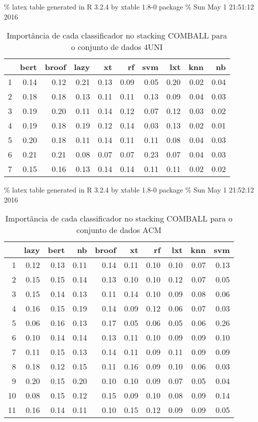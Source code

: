 \documentclass[]{article}
\begin{document}
\% latex table generated in R 3.2.4 by xtable 1.8-0 package \% Sun May 1
21:51:12 2016

\begin{table}[ht]
\centering
\begin{tabular}{rrrrrrrrrr}
  \hline
 & bert & broof & lazy & xt & rf & svm & lxt & knn & nb \\ 
  \hline
1 & 0.14 & 0.12 & 0.21 & 0.13 & 0.09 & 0.05 & 0.20 & 0.02 & 0.04 \\ 
  2 & 0.18 & 0.18 & 0.13 & 0.11 & 0.11 & 0.13 & 0.09 & 0.04 & 0.03 \\ 
  3 & 0.19 & 0.20 & 0.11 & 0.14 & 0.12 & 0.07 & 0.12 & 0.03 & 0.02 \\ 
  4 & 0.19 & 0.18 & 0.19 & 0.12 & 0.14 & 0.03 & 0.13 & 0.02 & 0.01 \\ 
  5 & 0.20 & 0.18 & 0.11 & 0.14 & 0.11 & 0.11 & 0.08 & 0.04 & 0.03 \\ 
  6 & 0.21 & 0.21 & 0.08 & 0.07 & 0.07 & 0.23 & 0.07 & 0.04 & 0.03 \\ 
  7 & 0.15 & 0.16 & 0.13 & 0.14 & 0.14 & 0.11 & 0.11 & 0.02 & 0.02 \\ 
   \hline
\end{tabular}
\caption{Importância de cada classificador no stacking COMBALL para o conjunto de dados 4UNI} 
\label{tab:imp4uni}
\end{table}

\% latex table generated in R 3.2.4 by xtable 1.8-0 package \% Sun May 1
21:52:12 2016

\begin{table}[ht]
\centering
\begin{tabular}{rrrrrrrrrr}
  \hline
 & lazy & bert & nb & broof & xt & rf & lxt & knn & svm \\ 
  \hline
1 & 0.12 & 0.13 & 0.11 & 0.14 & 0.11 & 0.10 & 0.10 & 0.07 & 0.13 \\ 
  2 & 0.15 & 0.15 & 0.14 & 0.13 & 0.10 & 0.10 & 0.12 & 0.07 & 0.05 \\ 
  3 & 0.15 & 0.14 & 0.13 & 0.11 & 0.14 & 0.10 & 0.09 & 0.08 & 0.06 \\ 
  4 & 0.16 & 0.15 & 0.19 & 0.14 & 0.09 & 0.12 & 0.06 & 0.07 & 0.03 \\ 
  5 & 0.06 & 0.16 & 0.13 & 0.17 & 0.05 & 0.06 & 0.05 & 0.06 & 0.26 \\ 
  6 & 0.10 & 0.14 & 0.14 & 0.13 & 0.11 & 0.10 & 0.09 & 0.09 & 0.10 \\ 
  7 & 0.11 & 0.15 & 0.13 & 0.14 & 0.11 & 0.09 & 0.11 & 0.09 & 0.09 \\ 
  8 & 0.18 & 0.12 & 0.15 & 0.11 & 0.16 & 0.09 & 0.10 & 0.06 & 0.03 \\ 
  9 & 0.20 & 0.15 & 0.20 & 0.10 & 0.10 & 0.09 & 0.07 & 0.05 & 0.04 \\ 
  10 & 0.08 & 0.15 & 0.12 & 0.15 & 0.09 & 0.10 & 0.08 & 0.09 & 0.14 \\ 
  11 & 0.16 & 0.14 & 0.11 & 0.10 & 0.15 & 0.12 & 0.09 & 0.09 & 0.05 \\ 
   \hline
\end{tabular}
\caption{Importância de cada classificador no stacking COMBALL para o conjunto de dados ACM} 
\label{tab:impacm}
\end{table}

\renewcommand\refname{References}

\end{document}
